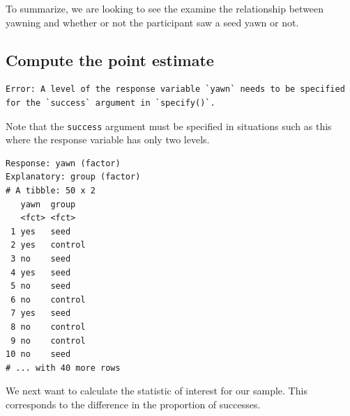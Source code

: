 \documentclass[12pt,]{krantz}
\makeatletter
\newenvironment{Shaded}{\begin{snugshade}}{\end{snugshade}}
\newcommand{\KeywordTok}[1]{\textcolor[rgb]{0.27,0.27,0.27}{\textbf{#1}}}
\newcommand{\DataTypeTok}[1]{\textcolor[rgb]{0.27,0.27,0.27}{#1}}
\newcommand{\StringTok}[1]{\textcolor[rgb]{0.5,0.5,0.5}{#1}}
\newcommand{\OperatorTok}[1]{\textcolor[rgb]{0.43,0.43,0.43}{\textbf{#1}}}
\newcommand{\NormalTok}[1]{#1}
\newenvironment{kframe}{%
\medskip{}
\setlength{\fboxsep}{.8em}
 \def\at@end@of@kframe{}%
 \ifinner\ifhmode%
  \def\at@end@of@kframe{\end{minipage}}%
  \begin{minipage}{\columnwidth}%
 \fi\fi%
 \def\FrameCommand##1{\hskip\@totalleftmargin \hskip-\fboxsep
 \colorbox{shadecolor}{##1}\hskip-\fboxsep
     \hskip-\linewidth \hskip-\@totalleftmargin \hskip\columnwidth}%
 \MakeFramed {\advance\hsize-\width
   \@totalleftmargin\z@ \linewidth\hsize
   \@setminipage}}%
 {\par\unskip\endMakeFramed%
 \at@end@of@kframe}
\renewenvironment{Shaded}{\begin{kframe}}{\end{kframe}}
\theoremstyle{definition}
\theoremstyle{definition}
\theoremstyle{definition}
\theoremstyle{remark}
\makeatother
\begin{document}
To summarize, we are looking to see the examine the relationship between
yawning and whether or not the participant saw a seed yawn or not.

\subsection{Compute the point
estimate}\label{compute-the-point-estimate}

\begin{Shaded}
\end{Shaded}

\begin{verbatim}
Error: A level of the response variable `yawn` needs to be specified for the `success` argument in `specify()`.
\end{verbatim}

Note that the \texttt{success} argument must be specified in situations
such as this where the response variable has only two levels.

\begin{Shaded}
\end{Shaded}

\begin{verbatim}
Response: yawn (factor)
Explanatory: group (factor)
# A tibble: 50 x 2
   yawn  group  
   <fct> <fct>  
 1 yes   seed   
 2 yes   control
 3 no    seed   
 4 yes   seed   
 5 no    seed   
 6 no    control
 7 yes   seed   
 8 no    control
 9 no    control
10 no    seed   
# ... with 40 more rows
\end{verbatim}

We next want to calculate the statistic of interest for our sample. This
corresponds to the difference in the proportion of successes.

\begin{Shaded}
\end{Shaded}
\end{document}
